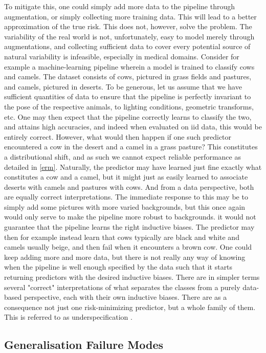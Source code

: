 		To mitigate this, one could simply add more data to the pipeline through augmentation, or simply collecting more training data. This will lead to a better approximation of the true risk. This does not, however, solve the problem. The variability of the real world is not, unfortunately, easy to model merely through augmentations, and collecting sufficient data to cover every potential source of natural variability is infeasible, especially in medical domains. 
		Consider for example a machine-learning pipeline wherein a model is trained to classify cows and camels. The dataset consists of cows, pictured in grass fields and pastures, and camels, pictured in deserts. To be generous, let us assume that we have sufficient quantities of data to ensure that the pipeline is perfectly invariant to the pose of the respective animals, to lighting conditions, geometric transforms, etc. One may then expect that the pipeline correctly learns to classify the two, and attains high accuracies, and indeed when evaluated on iid data, this would be entirely correct. However, what would then happen if one such predictor encountered a cow in the desert and a camel in a grass pasture? This constitutes a distributional shift, and as such we cannot expect reliable performance as detailed in \ref{erm}. Naturally, the predictor may have learned just fine exactly what constitutes a cow and a camel, but it might just as easily learned to associate deserts with camels and pastures with cows. And from a data perspective, both are equally correct interpretations. The immediate response to this may be to simply add some pictures with more varied backgrounds, but this once again would only serve to make the pipeline more robust to backgrounds. it would not guarantee that the pipeline learns the right inductive biases. The predictor may then for example instead learn that cows typically are black and white and camels usually beige, and then fail when it encounters a brown cow. One could keep adding more and more data, but there is not really any way of knowing when the pipeline is well enough specified by the data such that it starts returning predictors with the desired inductive biases. There are in simpler terms several "correct" interpretations of what separates the classes from a purely data-based perspective, each with their own inductive biases. There are as a consequence not just one risk-minimizing predictor, but a whole family of them. This is referred to as underspecification \cite{damour2020underspecification}.
	
	\subsection{Generalisation Failure Modes}
